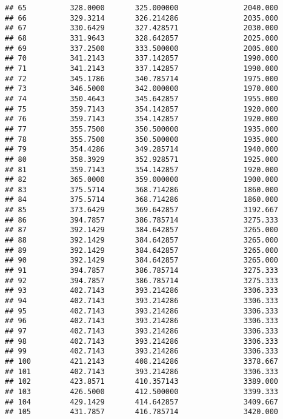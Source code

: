\documentclass[]{article}
\begin{document}
\begin{verbatim}
## 65          328.0000       325.000000               2040.000
## 66          329.3214       326.214286               2035.000
## 67          330.6429       327.428571               2030.000
## 68          331.9643       328.642857               2025.000
## 69          337.2500       333.500000               2005.000
## 70          341.2143       337.142857               1990.000
## 71          341.2143       337.142857               1990.000
## 72          345.1786       340.785714               1975.000
## 73          346.5000       342.000000               1970.000
## 74          350.4643       345.642857               1955.000
## 75          359.7143       354.142857               1920.000
## 76          359.7143       354.142857               1920.000
## 77          355.7500       350.500000               1935.000
## 78          355.7500       350.500000               1935.000
## 79          354.4286       349.285714               1940.000
## 80          358.3929       352.928571               1925.000
## 81          359.7143       354.142857               1920.000
## 82          365.0000       359.000000               1900.000
## 83          375.5714       368.714286               1860.000
## 84          375.5714       368.714286               1860.000
## 85          373.6429       369.642857               3192.667
## 86          394.7857       386.785714               3275.333
## 87          392.1429       384.642857               3265.000
## 88          392.1429       384.642857               3265.000
## 89          392.1429       384.642857               3265.000
## 90          392.1429       384.642857               3265.000
## 91          394.7857       386.785714               3275.333
## 92          394.7857       386.785714               3275.333
## 93          402.7143       393.214286               3306.333
## 94          402.7143       393.214286               3306.333
## 95          402.7143       393.214286               3306.333
## 96          402.7143       393.214286               3306.333
## 97          402.7143       393.214286               3306.333
## 98          402.7143       393.214286               3306.333
## 99          402.7143       393.214286               3306.333
## 100         421.2143       408.214286               3378.667
## 101         402.7143       393.214286               3306.333
## 102         423.8571       410.357143               3389.000
## 103         426.5000       412.500000               3399.333
## 104         429.1429       414.642857               3409.667
## 105         431.7857       416.785714               3420.000

\end{verbatim}
\end{document}
